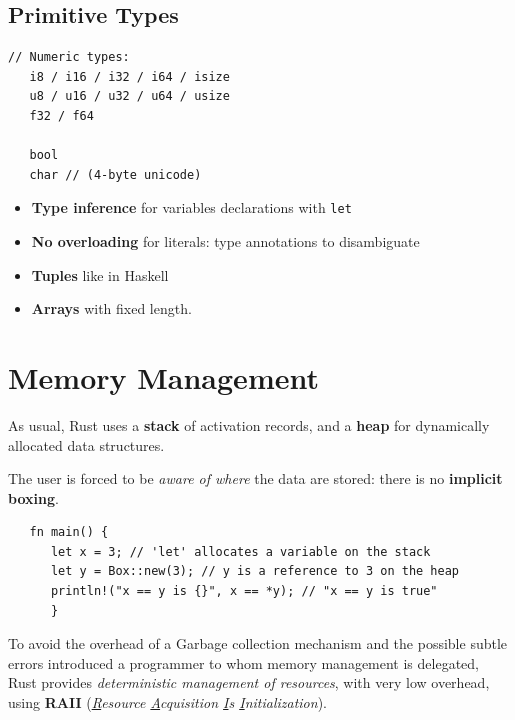 \subsection{Primitive Types}
\begin{lstlisting}[caption={Rust primitive types}]
   // Numeric types:
   i8 / i16 / i32 / i64 / isize
   u8 / u16 / u32 / u64 / usize
   f32 / f64
   
   bool
   char // (4-byte unicode)
\end{lstlisting}
\begin{itemize}
\item \textbf{Type inference} for variables declarations with \lstinline|let|
\item \textbf{No overloading} for literals: type annotations to disambiguate
\item \textbf{Tuples} like in Haskell
\item \textbf{Arrays} with fixed length. 
\end{itemize}

\section{Memory Management}
As usual, Rust uses a \textbf{stack} of activation records, and a \textbf{heap} for dynamically allocated data structures.

The user is forced to be \textit{aware of where} the data are stored: 
there is no \textbf{implicit boxing}\footnotemark.


\begin{lstlisting}
   fn main() {
      let x = 3; // 'let' allocates a variable on the stack
      let y = Box::new(3); // y is a reference to 3 on the heap
      println!("x == y is {}", x == *y); // "x == y is true"
      }
\end{lstlisting}

To avoid the overhead of a Garbage collection mechanism and the possible subtle errors introduced a programmer to whom memory management is delegated, Rust provides \textit{deterministic management of
resources}, with very low overhead, using \textbf{RAII} (\textit{\underline{R}esource \underline{A}cquisition \underline{I}s \underline{I}nitialization}).

